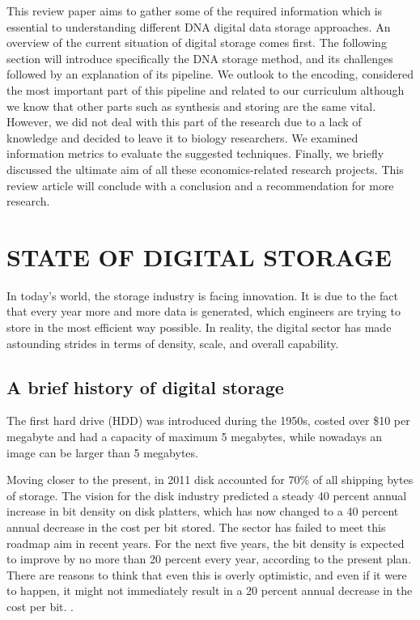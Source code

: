 \documentclass[10pt,twocolumn,twoside]{gsajnl}
\theoremstyle{definition}
\begin{document}
This review paper aims to gather some of the required information which is essential to understanding different DNA digital data storage approaches. An overview of the current situation of digital storage comes first. The following section will introduce specifically the DNA storage method, and its challenges followed by an explanation of its pipeline. We outlook to the encoding, considered the most important part of this pipeline and related to our curriculum although we know that other parts such as synthesis and storing are the same vital. 
However, we did not deal with this part of the research due to a lack of knowledge and decided to leave it to biology researchers. We examined information metrics to evaluate the suggested techniques. Finally, we briefly discussed the ultimate aim of all these economics-related research projects. This review article will conclude with a conclusion and a recommendation for more research.

\section{STATE OF DIGITAL STORAGE}
\label{sec:STATE OF DIGITAL STORAGE}
In today's world, the storage industry is facing innovation. It is due to the fact that every year more and more data is generated, which engineers are trying to store in the most efficient way possible.
In reality, the digital sector has made astounding strides in terms of density, scale, and overall capability.
\subsection{A brief history of digital storage}
The first hard drive (HDD) was introduced during the 1950s, costed over \$10 per megabyte and had a capacity of maximum 5 megabytes, while nowadays an image can be larger than 5 megabytes. 

Moving closer to the present, in 2011 disk accounted for 70\% of all shipping bytes of storage. The vision for the disk industry predicted a steady 40 percent annual increase in bit density on disk platters, which has now changed to a 40 percent annual decrease in the cost per bit stored. The sector has failed to meet this roadmap aim in recent years. For the next five years, the bit density is expected to improve by no more than 20 percent every year, according to the present plan. There are reasons to think that even this is overly optimistic, and even if it were to happen, it might not immediately result in a 20 percent annual decrease in the cost per bit. \cite{rosenthal2012economics}.
\end{document}
